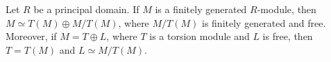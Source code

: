 


\begin{theorem}
	\label{thm:free+torsion}
	Let $R$ be a principal domain. 
	If $M$ is a finitely generated $R$-module, then $M\simeq T(M)\oplus M/T(M)$, where
	$M/T(M)$ is finitely generated and free. 
  Moreover, if
  $M=T\oplus L$, where $T$ is a torsion module and $L$ is free,
  then $T=T(M)$ and $L\simeq M/T(M)$.
\end{theorem}

